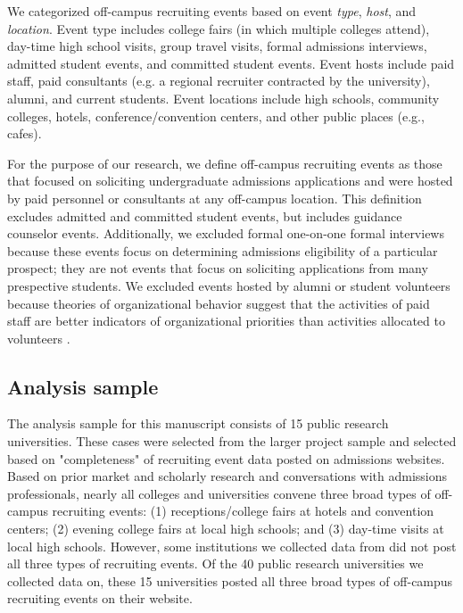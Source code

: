 \documentclass[twoside]{article}
\begin{document}
We categorized off-campus recruiting events based on event \textit{type}, \textit{host}, and \textit{location}. Event type includes college fairs (in which multiple colleges attend), day-time high school visits, group travel visits, formal admissions interviews, admitted student events, and committed student events. Event hosts include paid staff, paid consultants (e.g. a regional recruiter contracted by the university), alumni, and current students. Event locations include high schools, community colleges, hotels, conference/convention centers, and other public places (e.g., cafes).  

For the purpose of our research, we define off-campus recruiting events as those that focused on soliciting undergraduate admissions applications and were hosted by paid personnel or consultants at any off-campus location. This definition excludes admitted and committed student events, but includes guidance counselor events. Additionally, we excluded formal one-on-one formal interviews because these events focus on determining admissions eligibility of a particular prospect; they are not events that focus on soliciting applications from many prespective students. We excluded events hosted by alumni or student volunteers because theories of organizational behavior suggest that the activities of paid staff are better indicators of organizational priorities than activities allocated to volunteers \citep{RN531}.

\subsection*{Analysis sample}

The analysis sample for this manuscript consists of 15 public research universities. These cases were selected from the larger project sample and selected based on "completeness" of recruiting event data posted on admissions websites.  Based on prior market and scholarly research  \citep[e.g., ][]{RN3519,RN4324,RN4314,RN4402} and conversations with admissions professionals, nearly all colleges and universities convene three broad types of off-campus recruiting events: (1) receptions/college fairs at hotels and convention centers; (2) evening college fairs at local high schools; and (3) day-time visits at local high schools. However, some institutions we collected data from did not post all three types of recruiting events. Of the 40 public research universities we collected data on, these 15 universities posted all three broad types of off-campus recruiting events on their website. 
\end{document}
